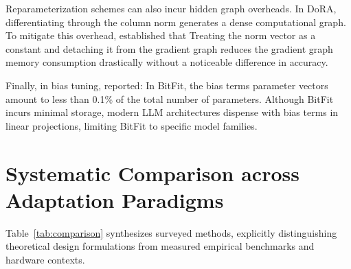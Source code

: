 \documentclass[11pt,a4paper]{article}
\begin{document}
Reparameterization schemes can also incur hidden graph overheads. In DoRA, differentiating through the column norm generates a dense computational graph. To mitigate this overhead, \citet{liu2024dora} established that Treating the norm vector as a constant and detaching it from the gradient graph reduces the gradient graph memory consumption drastically without a noticeable difference in accuracy.

Finally, in bias tuning, \citet{zaken2022bitfit} reported: In BitFit, the bias terms parameter vectors amount to less than 0.1\% of the total number of parameters. Although BitFit incurs minimal storage, modern LLM architectures dispense with bias terms in linear projections, limiting BitFit to specific model families.

\section{Systematic Comparison across Adaptation Paradigms}

Table~\ref{tab:comparison} synthesizes surveyed methods, explicitly distinguishing theoretical design formulations from measured empirical benchmarks and hardware contexts.
\end{document}
